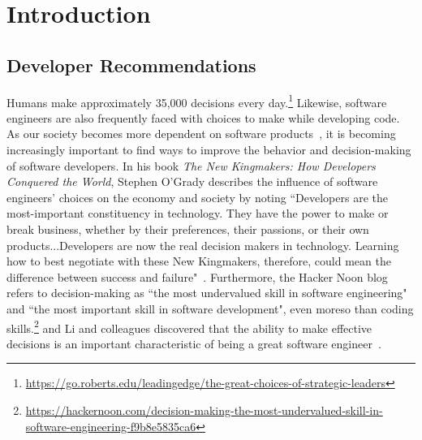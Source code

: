 \section{Introduction}

\subsection{Developer Recommendations}

Humans make approximately 35,000 decisions every day.\footnote{\url{https://go.roberts.edu/leadingedge/the-great-choices-of-strategic-leaders}} Likewise, software engineers are also frequently faced with choices to make while developing code. As our society becomes more dependent on software products~\cite{SoftwareEatWorld}, it is becoming increasingly important to find ways to improve the behavior and decision-making of software developers. In his book \textit{The New Kingmakers: How Developers Conquered the World}, Stephen O'Grady describes the influence of software engineers' choices on the economy and society by noting ``Developers are the most-important constituency in technology. They have the power to make or break business, whether by their preferences, their passions, or their own products...Developers are now the real decision makers in technology. Learning how to best negotiate with these New Kingmakers, therefore, could mean the difference between success and failure"~\cite[p.~3-4]{OGrady2013King}. Furthermore, the Hacker Noon blog refers to decision-making as ``the most undervalued skill in software engineering" and ``the most important skill in software development", even moreso than coding skills.\footnote{\url{https://hackernoon.com/decision-making-the-most-undervalued-skill-in-software-engineering-f9b8e5835ca6}} and Li and colleagues discovered that the ability to make effective decisions is an important characteristic of being a great software engineer~\cite{GreatSoftwareEngineer}. 

